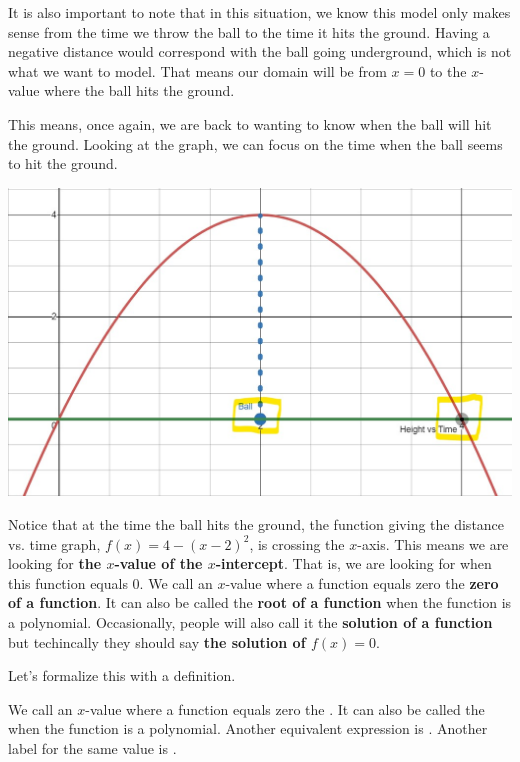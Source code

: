 \documentclass[nooutcomes]{ximera}
\begin{document}
\begin{example}
\begin{explanation}
It is also important to note that in this situation, we know this model only makes sense from the time we throw the ball to the time it hits the ground.  Having a negative distance would correspond with the ball going underground, which is not what we want to model.  That means our domain will be from $x=0$ to the $x$-value where the ball hits the ground.

This means, once again, we are back to wanting to know when the ball will hit the ground.  Looking at the graph, we can focus on the time when the ball seems to hit the ground.

\begin{image}
\includegraphics{Zeros-BouncingBall7}
\end{image}

Notice that at the time the ball hits the ground, the function giving the distance vs. time graph, $f(x)=4-(x-2)^2$, is crossing the $x$-axis.  This means we are looking for \textbf{the $x$-value of the $x$-intercept}.  That is, we are looking for when this function equals 0.  We call an $x$-value where a function equals zero the \textbf{zero of a function}.  It can also be called the \textbf{root of a function} when the function is a polynomial.  Occasionally, people will also call it the \textbf{solution of a function} but techincally they should say \textbf{the solution of $f(x)=0$}.

Let's formalize this with a definition.

\begin{definition}
We call an $x$-value where a function equals zero the .  It can also be called the  when the function is a polynomial. Another equivalent expression is .  Another label for the same value is .
\end{definition}


\end{explanation}
\end{example}
\end{document}
